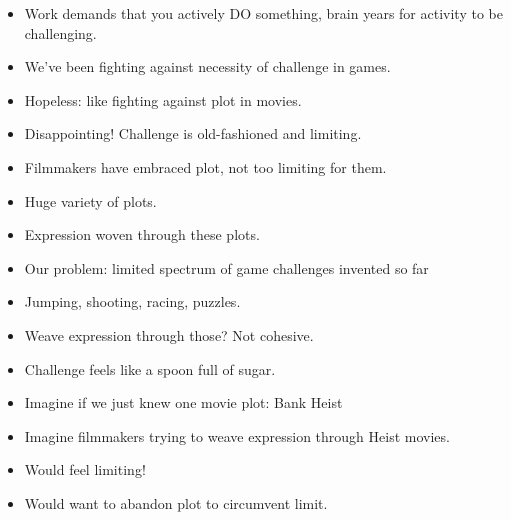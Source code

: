 \documentclass[12pt]{article}
\begin{document}
{\begin{itemize}
\item Work demands that you actively DO something, brain years for activity to be challenging.

\item We've been fighting against necessity of challenge in games.

\item Hopeless:  like fighting against plot in movies.

\item Disappointing!  Challenge is old-fashioned and limiting.
\end{itemize}

\begin{itemize}

\item Filmmakers have embraced plot, not too limiting for them.

\item Huge variety of plots.

\item Expression woven through these plots.
\end{itemize}

\begin{itemize}

\item Our problem:  limited spectrum of game challenges invented so far

\item Jumping, shooting, racing, puzzles.

\item Weave expression through those?  Not cohesive.

\item Challenge feels like a spoon full of sugar.
\end{itemize}

\begin{itemize}

\item Imagine if we just knew one movie plot:  Bank Heist

\item Imagine filmmakers trying to weave expression through Heist movies.

\item Would feel limiting!

\item Would want to abandon plot to circumvent limit. 


\end{itemize}}
\end{document}
